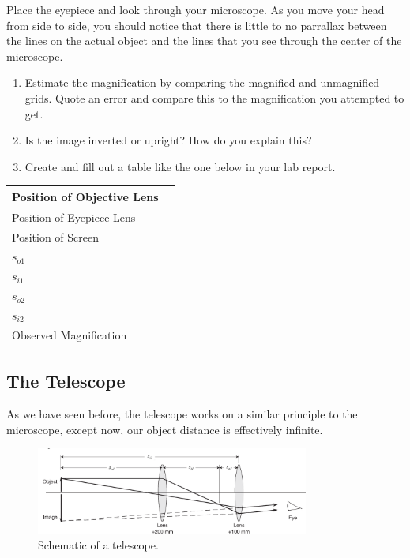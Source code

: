 Place the eyepiece and look through your microscope. As you move your head from side to side, you should notice that there is little to no parrallax between the lines on the actual object and the lines that you see through the center of the microscope.
\begin{enumerate}

\item Estimate the magnification by comparing the magnified and unmagnified grids. Quote an error and compare this to the magnification you attempted to get.

\item Is the image inverted or upright? How do you explain this?

\item Create and fill out a table like the one below in your lab report.

\end{enumerate}
\begin{center}
\begin{tabular}{|l|l|}

\hline
Position of Objective Lens & \hspace{4 cm} \\ \hline
Position of Eyepiece Lens &                    \\ \hline
Position of Screen &                    \\ \hline
$s_{o1}$ & \\ \hline
$s_{i1}$ & \\ \hline
$s_{o2}$ & \\ \hline
$s_{i2}$ & \\ \hline
Observed Magnification & \\ \hline

\end{tabular}
\end{center}


\subsection{The Telescope}
As we have seen before, the telescope works on a similar principle to the microscope, except now, our object distance is effectively infinite.
\myskip
\begin{figure}[h]
\centering
\includegraphics[width=0.8\textwidth]{./Exp7/pic/image10a.png}
\caption{Schematic of a telescope.}
\end{figure}

